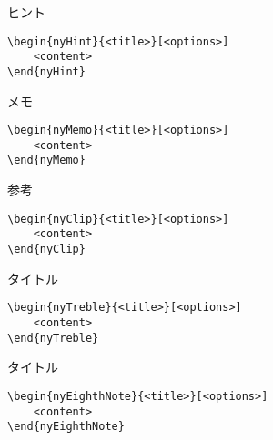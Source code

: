 \documentclass[dvipdfmx,uplatex,b5j,8pt,nomag*]{jsarticle}
\begin{document}
\begin{multicols}{2}
\begin{nyHint}{ヒント}
\end{nyHint}
\columnbreak
\begin{lstlisting}
\begin{nyHint}{<title>}[<options>]
    <content>
\end{nyHint}
\end{lstlisting}
\end{multicols}

\begin{multicols}{2}
\begin{nyMemo}{メモ}
\end{nyMemo}
\columnbreak
\begin{lstlisting}
\begin{nyMemo}{<title>}[<options>]
    <content>
\end{nyMemo}
\end{lstlisting}
\end{multicols}

\begin{multicols}{2}
\begin{nyClip}{参考}
\end{nyClip}
\columnbreak
\begin{lstlisting}
\begin{nyClip}{<title>}[<options>]
    <content>
\end{nyClip}
\end{lstlisting}
\end{multicols}

\begin{multicols}{2}
\begin{nyTreble}{タイトル}
\end{nyTreble}
\columnbreak
\begin{lstlisting}
\begin{nyTreble}{<title>}[<options>]
    <content>
\end{nyTreble}
\end{lstlisting}
\end{multicols}

\begin{multicols}{2}
\begin{nyEighthNote}{タイトル}
\end{nyEighthNote}
\columnbreak
\begin{lstlisting}
\begin{nyEighthNote}{<title>}[<options>]
    <content>
\end{nyEighthNote}
\end{lstlisting}
\end{multicols}
\end{document}
